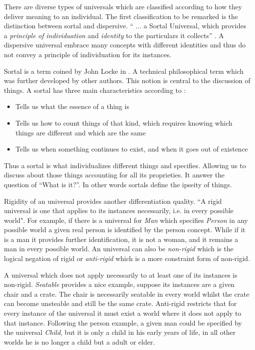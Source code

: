 There are diverse types of universals which are classified according to how they deliver meaning to an individual. The first classification to be remarked is the distinction between sortal and dispersive. `` ... a Sortal Universal, which provides a \textit{principle of individuation} and \textit{identity} to the particulars it collects'' \citep{guizzardi_ontological_2005}. A dispersive universal embrace many concepts with different identities and thus do not convey a principle of individuation for its instances.

Sortal is a term coined by John Locke in \cite{locke1841essay}. A technical philosophical term which was further developed by other authors. This notion is central to the discussion of things. A sortal has three main characteristics according to \cite{sep-sortals}:

\begin{itemize}
    \item Tells us what the essence of a thing is
    \item Tells us how to count things of that kind, which requires knowing which things are different and which are the same
    \item Tells us when something continues to exist, and when it goes out of existence
\end{itemize}

Thus a sortal is what individualizes different things and specifies. Allowing us to discuss about those things accounting for all its proprieties. It answer the question of ``What is it?''. In other words sortals define the ipseity of things.

Rigidity of an universal provides another differentiation quality. ``A rigid universal is one that applies to its instances necessarily, i.e. in every possible world"\citep{guizzardi_ontological_2005}. For example, if there is a universal for \textit{Man} which specifies \textit{Person} in any possible world a given real person is identified by the person concept. While if it is a man it provides further identification, it is not a woman, and it remains a man in every possible world. An universal can also be \textit{non-rigid} which is the logical negation of rigid or \textit{anti-rigid} which is a more constraint form of non-rigid.

A universal which does not apply necessarily to at least one of its instances is non-rigid. \textit{Seatable} provides a nice example, suppose its instances are a given chair and a crate. The chair is necessarily seatable in every world whilst the crate can become unsteable and still be the same crate. Anti-rigid restricts that for every instance of the universal it must exist a world where it does not apply to that instance. Following the person example, a given man could be specified by the universal \textit{Child}, but it is only a child in his early years of life, in all other worlds he is no longer a child but a adult or elder.

